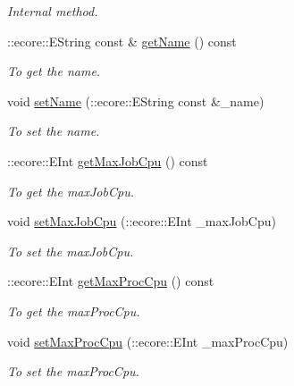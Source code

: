 \begin{DoxyCompactItemize}
\begin{DoxyCompactList}\small\item\em Internal method. \item\end{DoxyCompactList}\item 
::ecore::EString const \& \hyperlink{classTMS__Data_1_1Queue_af981924d34be88ade9f3b41036e8ee75}{getName} () const 
\begin{DoxyCompactList}\small\item\em To get the name. \item\end{DoxyCompactList}\item 
void \hyperlink{classTMS__Data_1_1Queue_a1c17012e4b82755eab154c5810e134a8}{setName} (::ecore::EString const \&\_\-name)
\begin{DoxyCompactList}\small\item\em To set the name. \item\end{DoxyCompactList}\item 
::ecore::EInt \hyperlink{classTMS__Data_1_1Queue_a5bd8d7908279e2ca208169c24e80bf91}{getMaxJobCpu} () const 
\begin{DoxyCompactList}\small\item\em To get the maxJobCpu. \item\end{DoxyCompactList}\item 
void \hyperlink{classTMS__Data_1_1Queue_a65afa067c4aa1f5f5c40b65764c8a32f}{setMaxJobCpu} (::ecore::EInt \_\-maxJobCpu)
\begin{DoxyCompactList}\small\item\em To set the maxJobCpu. \item\end{DoxyCompactList}\item 
::ecore::EInt \hyperlink{classTMS__Data_1_1Queue_a3628e2a6ccf24920cb6481facf407f5e}{getMaxProcCpu} () const 
\begin{DoxyCompactList}\small\item\em To get the maxProcCpu. \item\end{DoxyCompactList}\item 
void \hyperlink{classTMS__Data_1_1Queue_ac2d4d0a844edaf87402e3e55ea131f02}{setMaxProcCpu} (::ecore::EInt \_\-maxProcCpu)
\begin{DoxyCompactList}\small\item\em To set the maxProcCpu. \item\end{DoxyCompactList}\item 

\end{DoxyCompactItemize}
